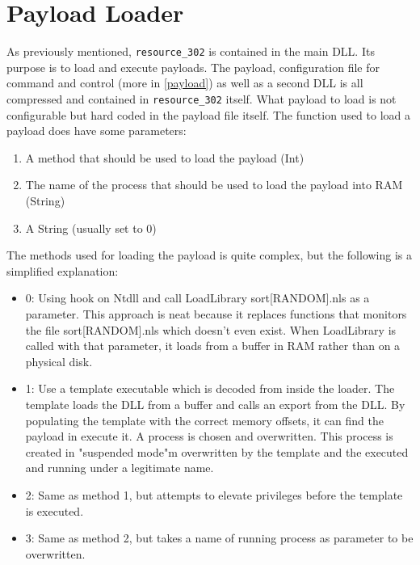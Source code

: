 \documentclass[11pt,english,a4paper]{report}
\begin{document}
\section{Payload Loader}
As previously mentioned, \texttt{resource\_302} is contained in the main DLL. Its purpose is to load and execute payloads. The payload, configuration file for command and control (more in \ref{payload}) as well as a second DLL is all compressed and contained in \texttt{resource\_302} itself. What payload to load is not configurable but hard coded in the payload file itself. The function used to load a payload does have some parameters:
 \begin{enumerate}
   \item A method that should be used to load the payload (Int)
   \item The name of the process that should be used to load the payload into RAM (String)
   \item A String (usually set to 0)
  \end{enumerate}
The methods used for loading the payload is quite complex, but the following is a simplified explanation:
  \begin{itemize}[label={}]
    \item 0: Using hook on Ntdll and call LoadLibrary sort[RANDOM].nls as a parameter. This approach is neat because it replaces functions that monitors the file sort[RANDOM].nls which doesn't even exist. When LoadLibrary is called with that parameter, it loads from a buffer in RAM rather than on a physical disk.
    \item 1: Use a template executable which is decoded from inside the loader. The template loads the DLL from a buffer and calls an export from the DLL. By populating the template with the correct memory offsets, it can find the payload in execute it. A process is chosen and overwritten. This process is created in "suspended mode"m overwritten by the template and the executed and running under a legitimate name.
    \item 2: Same as method 1, but attempts to elevate privileges before the template is executed. 
    \item 3: Same as method 2, but takes a name of running process as parameter to be overwritten.
  \end{itemize}
\end{document}
